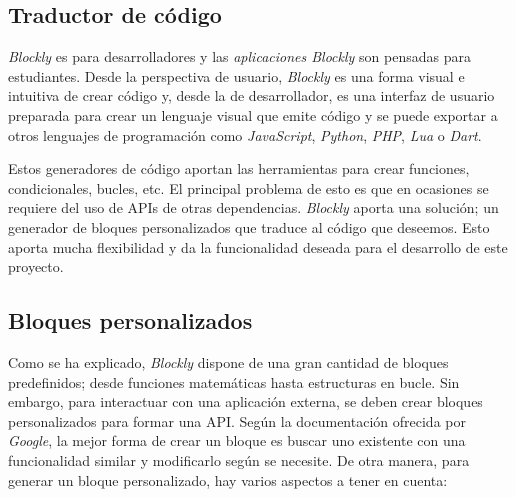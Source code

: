 \subsection{Traductor de código}
\textit{Blockly} es para desarrolladores y las \textit{aplicaciones Blockly} son pensadas para estudiantes. Desde la perspectiva de usuario, \textit{Blockly} es una forma visual e intuitiva de crear código y, desde la de desarrollador, es una interfaz de usuario preparada para crear un lenguaje visual que emite código y se puede exportar a otros lenguajes de programación como \textit{JavaScript}, \textit{Python}, \textit{PHP}, \textit{Lua} o \textit{Dart}. 

Estos generadores de código aportan las herramientas para crear funciones, condicionales, bucles, etc. El principal problema de esto es que en ocasiones se requiere del uso de APIs de otras dependencias. \textit{Blockly} aporta una solución; un generador de bloques personalizados que traduce al código que deseemos. Esto aporta mucha flexibilidad y da la funcionalidad deseada para el desarrollo de este proyecto. 

\subsection{Bloques personalizados}
Como se ha explicado, \textit{Blockly} dispone de una gran cantidad de bloques predefinidos; desde funciones matemáticas hasta estructuras en bucle. Sin embargo, para interactuar con una aplicación externa, se deben crear bloques personalizados para formar una API. Según la documentación ofrecida por \textit{Google}\cite{bib:docblockly}, la mejor forma de crear un bloque es buscar uno existente con una funcionalidad similar y modificarlo según se necesite. De otra manera, para generar un bloque personalizado, hay varios aspectos a tener en cuenta: 

